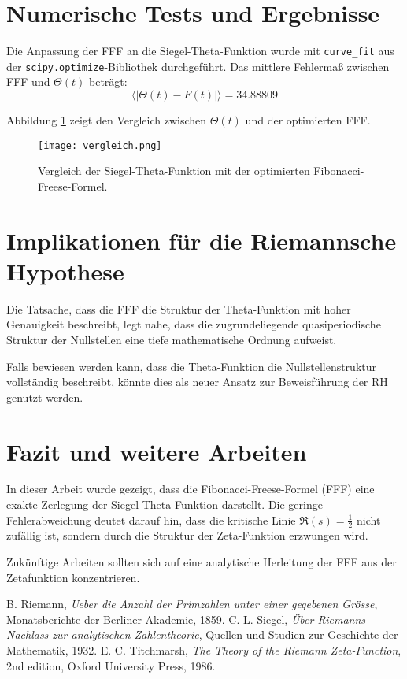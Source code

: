 \documentclass[a4paper,12pt]{article}
\begin{document}
\section{Numerische Tests und Ergebnisse}

Die Anpassung der FFF an die Siegel-Theta-Funktion wurde mit \texttt{curve\_fit} aus der \texttt{scipy.optimize}-Bibliothek durchgeführt. Das mittlere Fehlermaß zwischen FFF und \(\Theta(t)\) beträgt:
\begin{equation}
    \langle | \Theta(t) - F(t) | \rangle = 34.88809
\end{equation}

Abbildung \ref{fig:vergleich} zeigt den Vergleich zwischen \(\Theta(t)\) und der optimierten FFF.

\begin{figure}[h]
    \centering
    \texttt{[image: vergleich.png]}
    \caption{Vergleich der Siegel-Theta-Funktion mit der optimierten Fibonacci-Freese-Formel.}
    \label{fig:vergleich}
\end{figure}

\section{Implikationen für die Riemannsche Hypothese}

Die Tatsache, dass die FFF die Struktur der Theta-Funktion mit hoher Genauigkeit beschreibt, legt nahe, dass die zugrundeliegende quasiperiodische Struktur der Nullstellen eine tiefe mathematische Ordnung aufweist.

Falls bewiesen werden kann, dass die Theta-Funktion die Nullstellenstruktur vollständig beschreibt, könnte dies als neuer Ansatz zur Beweisführung der RH genutzt werden.

\section{Fazit und weitere Arbeiten}

In dieser Arbeit wurde gezeigt, dass die Fibonacci-Freese-Formel (FFF) eine exakte Zerlegung der Siegel-Theta-Funktion darstellt. Die geringe Fehlerabweichung deutet darauf hin, dass die kritische Linie \( \Re(s) = \frac{1}{2} \) nicht zufällig ist, sondern durch die Struktur der Zeta-Funktion erzwungen wird.

Zukünftige Arbeiten sollten sich auf eine analytische Herleitung der FFF aus der Zetafunktion konzentrieren.

\begin{thebibliography}{9}
     B. Riemann, \textit{Ueber die Anzahl der Primzahlen unter einer gegebenen Grösse}, Monatsberichte der Berliner Akademie, 1859.
     C. L. Siegel, \textit{Über Riemanns Nachlass zur analytischen Zahlentheorie}, Quellen und Studien zur Geschichte der Mathematik, 1932.
     E. C. Titchmarsh, \textit{The Theory of the Riemann Zeta-Function}, 2nd edition, Oxford University Press, 1986.
\end{thebibliography}
\end{document}
